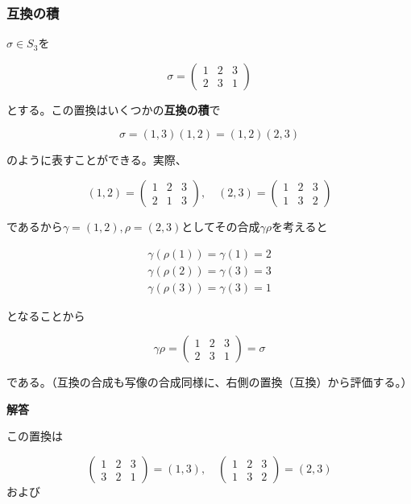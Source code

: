 \documentclass[dvipdfmx,autodetect-engine]{jsarticle}
\begin{document}
\subsubsection{互換の積}

$\sigma \in S_3$を

$$
\sigma = \begin{pmatrix}
1 & 2 & 3 \\
2 & 3 & 1
\end{pmatrix}
$$

とする。この置換はいくつかの{\bf 互換の積}で

$$
\sigma = (1, 3)(1, 2) = (1,2)(2,3)
$$

のように表すことができる。実際、


$$
(1, 2) = \begin{pmatrix}
1 & 2 & 3\\
2 & 1 & 3
\end{pmatrix}, \quad 
(2, 3) = \begin{pmatrix}
1 & 2 & 3 \\
1 & 3 & 2
\end{pmatrix}
$$

であるから$\gamma = (1, 2), \rho = (2, 3)$としてその合成$\gamma\rho$を考えると

\begin{eqnarray*}
\gamma(\rho(1)) = \gamma(1) = 2 \\
\gamma(\rho(2)) = \gamma(3) = 3 \\
\gamma(\rho(3)) = \gamma(3) = 1
\end{eqnarray*}

となることから

$$
\gamma\rho = \begin{pmatrix}
1 & 2 & 3 \\
2 & 3 & 1
\end{pmatrix} = \sigma
$$

である。（互換の合成も写像の合成同様に、右側の置換（互換）から評価する。）


{\bf 解答}

この置換は

$$
\begin{pmatrix}
1 & 2 & 3 \\
3 & 2 & 1
\end{pmatrix} = (1, 3),\quad 
\begin{pmatrix}
1 & 2 & 3 \\
1 & 3 & 2
\end{pmatrix} = (2, 3)
$$
および
\end{document}
